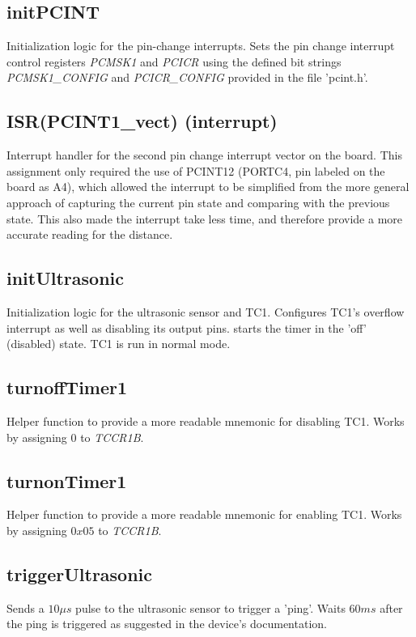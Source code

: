 \documentclass[letterpaper,11pt]{texMemo} %
\begin{document}
\subsection*{initPCINT}
Initialization logic for the pin-change interrupts. Sets the pin change interrupt control registers \textit{PCMSK1} and \textit{PCICR} using the defined bit strings \textit{PCMSK1\_CONFIG} and \textit{PCICR\_CONFIG} provided in the file 'pcint.h'.

\subsection*{ISR(PCINT1\_vect) (interrupt)}
Interrupt handler for the second pin change interrupt vector on the board. This assignment only required the use of PCINT12 (PORTC4, pin labeled on the board as A4), which allowed the interrupt to be simplified from the more general approach of capturing the current pin state and comparing with the previous state. This also made the interrupt take less time, and therefore provide a more accurate reading for the distance.

\subsection*{initUltrasonic}
Initialization logic for the ultrasonic sensor and TC1. Configures TC1's overflow interrupt as well as disabling its output pins. starts the timer in the 'off' (disabled) state. TC1 is run in normal mode.

\subsection*{turnoffTimer1}
Helper function to provide a more readable mnemonic for disabling TC1. Works by assigning $0$ to \textit{TCCR1B}.

\subsection*{turnonTimer1}
Helper function to provide a more readable mnemonic for enabling TC1. Works by assigning $0x05$ to \textit{TCCR1B}.

\subsection*{triggerUltrasonic}
Sends a $10\mu{s}$ pulse to the ultrasonic sensor to trigger a 'ping'. Waits $60ms$ after the ping is triggered as suggested in the device's documentation.
\end{document}
